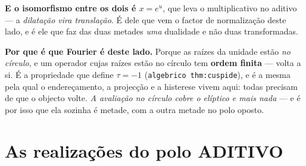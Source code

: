 \documentclass[11pt,a4paper]{article}
\newcommand{\code}[1]{\texttt{#1}}
\begin{document}
\noindent\textbf{E o isomorfismo entre os dois é $x=e^{u}$}, que leva o multiplicativo no
aditivo --- a \emph{dilatação vira translação}. É dele que vem o factor de normalização
deste lado, e é ele que faz das duas metades \emph{uma} dualidade e não duas transformadas.

\textbf{Por que é que Fourier é deste lado.} Porque as raízes da unidade estão \emph{no
círculo}, e um operador cujas raízes estão no círculo tem \textbf{ordem finita} --- volta a
si. É a propriedade que define $\tau=-1$ (\code{algebrico thm:cuspide}), e é a mesma pela
qual o endereçamento, a projecção e a histerese vivem aqui: todas precisam de que o objecto
volte. \emph{A avaliação no círculo cobre o elíptico e mais nada} --- e é por isso que ela
sozinha é metade, com a outra metade no polo oposto.

\section{As realizações do polo ADITIVO}\label{sec:realiz-aditivo}
\end{document}
